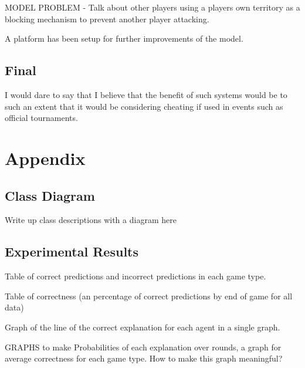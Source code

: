 \documentclass[parskip]{cs4rep}
\begin{document}
MODEL PROBLEM - Talk about other players using a players own territory as a blocking mechanism to prevent another player attacking.

A platform has been setup for further improvements of the model.

\section{Final}

I would dare to say that I believe that the benefit of such systems would be to such an extent that it would be considering cheating if used in events such as official tournaments.

\chapter{Appendix}

\section{Class Diagram}

Write up class descriptions with a diagram here

\section{Experimental Results}

Table of correct predictions and incorrect predictions in each game type.

Table of correctness (an percentage of correct predictions by end of game for all data)

Graph of the line of the correct explanation for each agent in a single graph.

GRAPHS to make
Probabilities of each explanation over rounds, a graph for average correctness for each game type.
How to make this graph meaningful?



\end{document}
